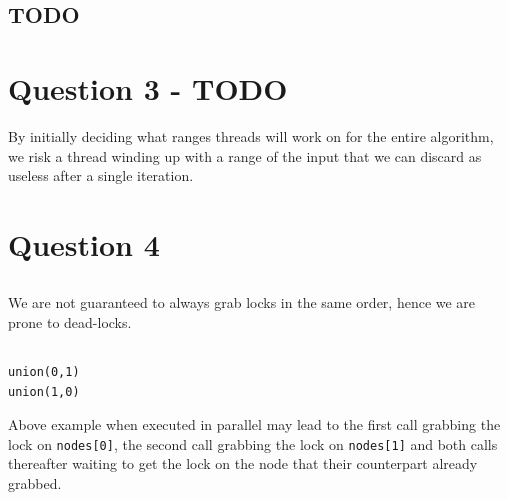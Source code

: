 \documentclass[a5paper]{article}
\begin{document}
\subsection{TODO} 

\section{Question 3 - TODO}
By initially deciding what ranges threads will work on for the entire algorithm, we risk a thread winding up
with a range of the input that we can discard as useless after a single iteration. 

\section{Question 4}
\subsection{}
We are not guaranteed to always grab locks in the same order, hence we are prone to dead-locks.

\subsection{}

\begin{lstlisting}
union(0,1)
union(1,0)
\end{lstlisting}

Above example when executed in parallel may lead to the first call grabbing the lock on \texttt{nodes[0]}, the second call grabbing the lock on \texttt{nodes[1]} and both calls thereafter waiting to get the lock on the node that their counterpart already grabbed.
\end{document}
